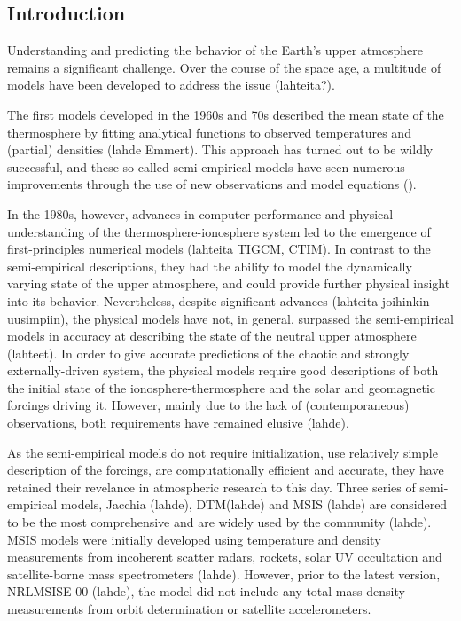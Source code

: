 \documentclass[referee,a4paper,12pt,traditabstract]{swsc}
\begin{document}
\begin{linenumbers}

   \maketitle

\section{Introduction}

Understanding and predicting the behavior of the Earth's upper atmosphere remains a significant challenge. Over the course of the space age, a multitude of models have been developed to address the issue (lahteita?). 

The first models developed in the 1960s and 70s described the mean state of the thermosphere by fitting analytical functions to observed temperatures and (partial) densities (lahde Emmert). This approach has turned out to be wildly successful, and these so-called semi-empirical models have seen numerous improvements through the use of new observations and model equations (). 

In the 1980s, however, advances in computer performance and physical understanding of the thermosphere-ionosphere system led to the emergence of first-principles numerical models (lahteita TIGCM, CTIM). In contrast to the semi-empirical descriptions, they had the ability to model the dynamically varying state of the upper atmosphere, and could provide further physical insight into its behavior. Nevertheless, despite significant advances (lahteita joihinkin uusimpiin), the physical models have not, in general, surpassed the semi-empirical models in accuracy at describing the state of the neutral upper atmosphere (lahteet). In order to give accurate predictions of the chaotic and strongly externally-driven system, the physical models require good descriptions of both the initial state of the ionosphere-thermosphere and the solar and geomagnetic forcings driving it. However, mainly due to the lack of (contemporaneous) observations, both requirements have remained elusive (lahde). 

As the semi-empirical models do not require initialization, use relatively simple description of the forcings, are computationally efficient and accurate, they have retained their revelance in atmospheric research to this day. Three series of semi-empirical models, Jacchia (lahde), DTM(lahde) and MSIS (lahde) are considered to be the most comprehensive and are widely used by the community (lahde). MSIS models were initially developed using temperature and density measurements from incoherent scatter radars, rockets, solar UV occultation and satellite-borne mass spectrometers (lahde). However, prior to the latest version, NRLMSISE-00 (lahde), the model did not include any total mass density measurements from orbit determination or satellite accelerometers.


\end{linenumbers}
\end{document}
